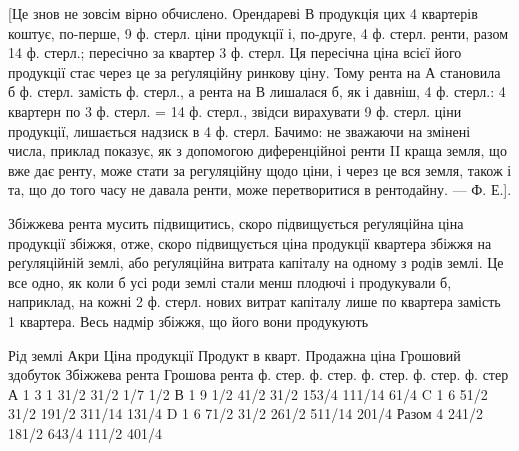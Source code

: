 [Це знов не зовсім вірно обчислено. Орендареві В продукція цих 4 квартерів
коштує, по-перше, 9 ф. стерл. ціни продукції і, по-друге,
4 ф. стерл. ренти, разом 14 ф. стерл.; пересічно за квартер 3 ф. стерл.
Ця пересічна ціна всієї його продукції стає через це за реґуляційну ринкову ціну. Тому рента на
А становила б  ф. стерл. замість  ф. стерл., а рента на В лишалася б, як і давніш, 4 ф.
стерл.: 4 квартерн по 3 ф. стерл. = 14 ф. стерл., звідси вирахувати
9 ф. стерл. ціни продукції, лишається надзиск в 4 ф. стерл. Бачимо: не
зважаючи на змінені числа, приклад показує, як з допомогою диференційноі
ренти II краща земля, що вже дає ренту, може стати за регуляційну щодо ціни,
і через це вся земля, також і та, що до того часу не давала ренти, може перетворитися
в рентодайну. — Ф. Е.].

Збіжжева рента мусить підвищитись, скоро підвищується реґуляційна
ціна продукції збіжжя, отже, скоро підвищується ціна продукції квартера збіжжя
на реґуляційній землі, або реґуляційна витрата капіталу на одному з родів
землі. Це все одно, як коли б усі роди землі стали менш плодючі і продукували
б, наприклад, на кожні 2 ф. стерл. нових витрат капіталу лише по 
квартера замість 1 квартера. Весь надмір збіжжя, що його вони продукують

Рід землі    Акри    Ціна продукції    Продукт в кварт. Продажна  ціна    Грошовий  здобуток
Збіжжева рента    Грошова  рента
        ф. стер. ф. стер. ф. стер. ф. стер. ф. стер
А                    1    3             1            31/2       31/2        1/7            1/2
В                    1    9 1/2       41/2    31/2       153/4        111/14    61/4
C                    1    6             51/2    31/2        191/2        311/14    131/4
D                    1    6             71/2    31/2        261/2        511/14     201/4
Разом           4    241/2    181/2           643/4    111/2            401/4
\parbreak{}  %
